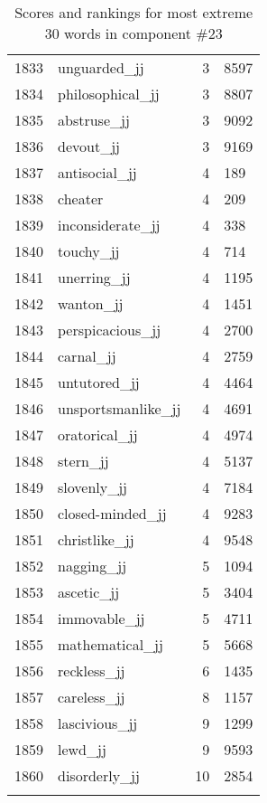 \begin{longtable}[!htbp]{| rlr@{.}l |}
    1833 & unguarded\_jj & 3 & 8597 \\
    1834 & philosophical\_jj & 3 & 8807 \\
    1835 & abstruse\_jj & 3 & 9092 \\
    1836 & devout\_jj & 3 & 9169 \\
    1837 & antisocial\_jj & 4 & 189 \\
    1838 & cheater & 4 & 209 \\
    1839 & inconsiderate\_jj & 4 & 338 \\
    1840 & touchy\_jj & 4 & 714 \\
    1841 & unerring\_jj & 4 & 1195 \\
    1842 & wanton\_jj & 4 & 1451 \\
    1843 & perspicacious\_jj & 4 & 2700 \\
    1844 & carnal\_jj & 4 & 2759 \\
    1845 & untutored\_jj & 4 & 4464 \\
    1846 & unsportsmanlike\_jj & 4 & 4691 \\
    1847 & oratorical\_jj & 4 & 4974 \\
    1848 & stern\_jj & 4 & 5137 \\
    1849 & slovenly\_jj & 4 & 7184 \\
    1850 & closed-minded\_jj & 4 & 9283 \\
    1851 & christlike\_jj & 4 & 9548 \\
    1852 & nagging\_jj & 5 & 1094 \\
    1853 & ascetic\_jj & 5 & 3404 \\
    1854 & immovable\_jj & 5 & 4711 \\
    1855 & mathematical\_jj & 5 & 5668 \\
    1856 & reckless\_jj & 6 & 1435 \\
    1857 & careless\_jj & 8 & 1157 \\
    1858 & lascivious\_jj & 9 & 1299 \\
    1859 & lewd\_jj & 9 & 9593 \\
    1860 & disorderly\_jj & 10 & 2854 \\
    \hline
    \caption{Scores and rankings for most extreme 30 words in component \#23} \\
\end{longtable}

